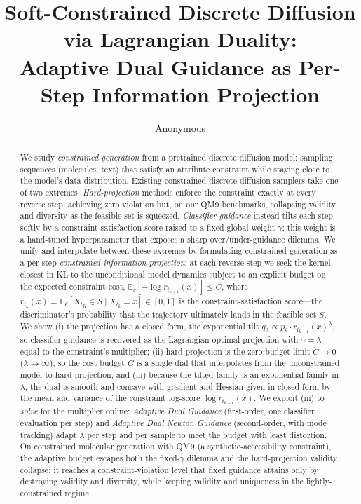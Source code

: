 \documentclass{article}
\title{Soft-Constrained Discrete Diffusion via Lagrangian Duality:\\ Adaptive Dual Guidance as Per-Step Information Projection}
\author{Anonymous}
\date{}
\newcommand{\E}{\mathbb{E}}
\begin{document}
\maketitle

\begin{abstract}
We study \emph{constrained generation} from a pretrained discrete diffusion model: sampling sequences (molecules, text) that satisfy an attribute constraint while staying close to the model's data distribution. Existing constrained discrete-diffusion samplers take one of two extremes. \emph{Hard-projection} methods enforce the constraint exactly at every reverse step, achieving zero violation but, on our QM9 benchmarks, collapsing validity and diversity as the feasible set is squeezed. \emph{Classifier guidance} instead tilts each step softly by a constraint-satisfaction score raised to a fixed global weight $\gamma$; this weight is a hand-tuned hyperparameter that exposes a sharp over/under-guidance dilemma. We unify and interpolate between these extremes by formulating constrained generation as a per-step \emph{constrained information projection}: at each reverse step we seek the kernel closest in KL to the unconditional model dynamics subject to an explicit budget on the expected constraint cost, $\E_q[-\log r_{t_{k+1}}(x)]\le C$, where $r_{t_k}(x)=\mathbb P_\theta[X_{t_K}\in S\mid X_{t_k}=x]\in[0,1]$ is the constraint-satisfaction score---the discriminator's probability that the trajectory ultimately lands in the feasible set $S$. We show (i) the projection has a closed form, the exponential tilt $q_\lambda\propto p_\theta\cdot r_{t_{k+1}}(x)^\lambda$, so classifier guidance is recovered as the Lagrangian-optimal projection with $\gamma=\lambda$ equal to the constraint's multiplier; (ii) hard projection is the zero-budget limit $C\to0$ ($\lambda\to\infty$), so the cost budget $C$ is a single dial that interpolates from the unconstrained model to hard projection; and (iii) because the tilted family is an exponential family in $\lambda$, the dual is smooth and concave with gradient and Hessian given in closed form by the mean and variance of the constraint log-score $\log r_{t_{k+1}}(x)$. We exploit (iii) to \emph{solve} for the multiplier online: \emph{Adaptive Dual Guidance} (first-order, one classifier evaluation per step) and \emph{Adaptive Dual Newton Guidance} (second-order, with mode tracking) adapt $\lambda$ per step and per sample to meet the budget with least distortion. On constrained molecular generation with QM9 (a synthetic-accessibility constraint), the adaptive budget escapes both the fixed-$\gamma$ dilemma and the hard-projection validity collapse: it reaches a constraint-violation level that fixed guidance attains only by destroying validity and diversity, while keeping validity and uniqueness in the lightly-constrained regime.
\end{abstract}
\end{document}
